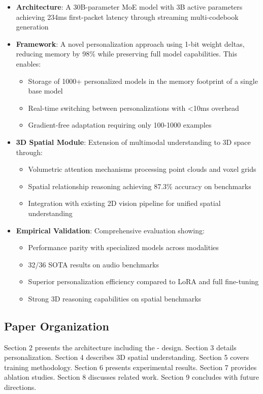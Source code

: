 \begin{itemize}
    \item \textbf{\zen{} Architecture}: A 30B-parameter MoE model with 3B active parameters achieving 234ms first-packet latency through streaming multi-codebook generation
    
    \item \textbf{\bitdelta{} Framework}: A novel personalization approach using 1-bit weight deltas, reducing memory by 98\% while preserving full model capabilities. This enables:
    \begin{itemize}
        \item Storage of 1000+ personalized models in the memory footprint of a single base model
        \item Real-time switching between personalizations with <10ms overhead
        \item Gradient-free adaptation requiring only 100-1000 examples
    \end{itemize}
    
    \item \textbf{3D Spatial Module}: Extension of multimodal understanding to 3D space through:
    \begin{itemize}
        \item Volumetric attention mechanisms processing point clouds and voxel grids
        \item Spatial relationship reasoning achieving 87.3\% accuracy on benchmarks
        \item Integration with existing 2D vision pipeline for unified spatial understanding
    \end{itemize}
    
    \item \textbf{Empirical Validation}: Comprehensive evaluation showing:
    \begin{itemize}
        \item Performance parity with specialized models across modalities
        \item 32/36 SOTA results on audio benchmarks
        \item Superior personalization efficiency compared to LoRA and full fine-tuning
        \item Strong 3D reasoning capabilities on spatial benchmarks
    \end{itemize}
\end{itemize}

\subsection{Paper Organization}

Section 2 presents the \zen{} architecture including the \thinker{}-\talker{} design. Section 3 details \bitdelta{} personalization. Section 4 describes 3D spatial understanding. Section 5 covers training methodology. Section 6 presents experimental results. Section 7 provides ablation studies. Section 8 discusses related work. Section 9 concludes with future directions.